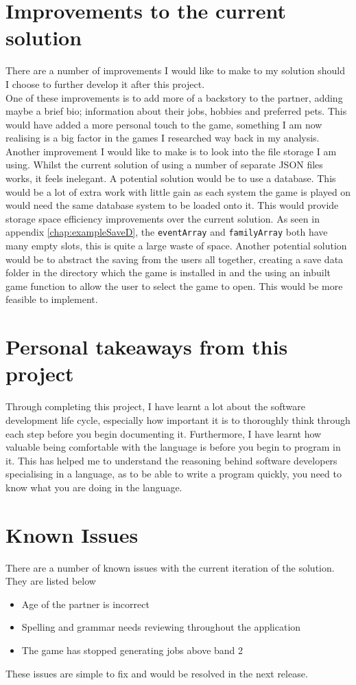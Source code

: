 \section{Improvements to the current solution}
There are a number of improvements I would like to make to my solution should I choose to further develop it after this project.\\
One of these improvements is to add more of a backstory to the partner, adding maybe a brief bio; information about their jobs, hobbies and preferred pets. This would have added a more personal touch to the game, something I am now realising is a big factor in the games I researched way back in my analysis.\\
Another improvement I would like to make is to look into the file storage I am using. Whilst the current solution of using a number of separate JSON files works, it feels inelegant. A potential solution would be to use a database. This would be a lot of extra work with little gain as each system the game is played on would need the same database system to be loaded onto it. This would provide storage space efficiency improvements over the current solution. As seen in appendix \ref{chap:exampleSaveD}, the \verb|eventArray| and \verb|familyArray| both have many empty slots, this is quite a large waste of space. Another potential solution would be to abstract the saving from the users all together, creating a save data folder in the directory which the game is installed in and the using an inbuilt game function to allow the user to select the game to open. This would be more feasible to implement.

\section{Personal takeaways from this project}
Through completing this project, I have learnt a lot about the software development life cycle, especially how important it is to thoroughly think through each step before you begin documenting it. Furthermore, I have learnt how valuable being comfortable with the language is before you begin to program in it. This has helped me to understand the reasoning behind software developers specialising in a language, as to be able to write a program quickly, you need to know what you are doing in the language.

\section{Known Issues}
There are a number of known issues with the current iteration of the solution. They are listed below
\begin{itemize}
    \item Age of the partner is incorrect
    \item Spelling and grammar needs reviewing throughout the application
    \item The game has stopped generating jobs above band 2
\end{itemize}
These issues are simple to fix and would be resolved in the next release.